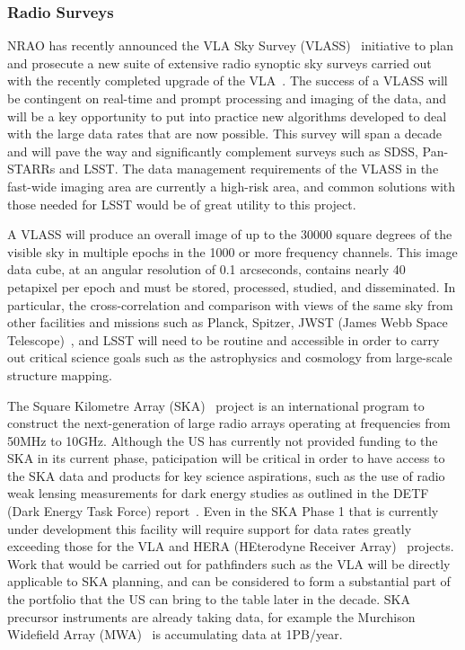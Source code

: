 \subsubsection{Radio Surveys}

NRAO has recently announced the VLA Sky Survey (VLASS)~\cite{vlass}
initiative to plan and prosecute a new suite of extensive radio
synoptic sky surveys carried out with the recently completed upgrade
of the VLA~\cite{evla}. The success of a VLASS will be contingent on
real-time and prompt processing and imaging of the data, and will be a
key opportunity to put into practice new algorithms developed to deal
with the large data rates that are now possible. This survey will span
a decade and will pave the way and significantly complement surveys
such as SDSS, Pan-STARRs and LSST. The data management requirements of
the VLASS in the fast-wide imaging area are currently a high-risk
area, and common solutions with those needed for LSST would be of
great utility to this project.

A VLASS will produce an overall image of up to the 30000 square
degrees of the visible sky in multiple epochs in the 1000 or more
frequency channels. This image data cube, at an angular resolution of
0.1 arcseconds, contains nearly 40 petapixel per epoch and must be
stored, processed, studied, and disseminated. In particular, the
cross-correlation and comparison with views of the same sky from other
facilities and missions such as Planck, Spitzer, JWST (James Webb
Space Telescope)~\cite{jwst}, and LSST will need to be routine and
accessible in order to carry out critical science goals such as the
astrophysics and cosmology from large-scale structure mapping.

The Square Kilometre Array (SKA)~\cite{ska} project is an
international program to construct the next-generation of large radio
arrays operating at frequencies from 50MHz to 10GHz. Although the US
has currently not provided funding to the SKA in its current phase,
paticipation will be critical in order to have access to the SKA data
and products for key science aspirations, such as the use of radio
weak lensing measurements for dark energy studies as outlined in the
DETF (Dark Energy Task Force) report~\cite{detf}. Even in the SKA
Phase 1 that is currently under development this facility will require
support for data rates greatly exceeding those for the VLA
and HERA (HEterodyne Receiver Array)~\cite{hera} projects. Work that
would be carried out for pathfinders such as the VLA will be directly
applicable to SKA planning, and can be considered to form a
substantial part of the portfolio that the US can bring to the table
later in the decade. SKA precursor instruments are already taking
data, for example the Murchison Widefield Array (MWA)~\cite{mwa} is
accumulating data at 1PB/year.

